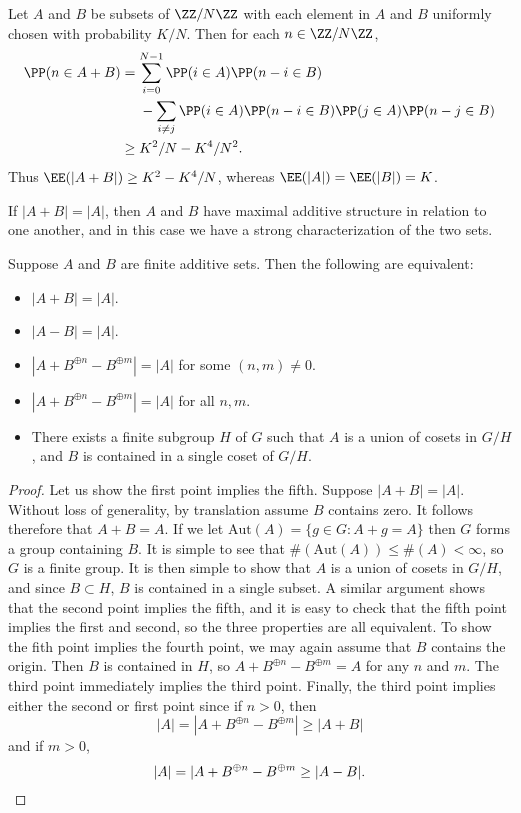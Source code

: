 \begin{example}
    Let $A$ and $B$ be subsets of $\ZZ/N \ZZ$ with each element in $A$ and $B$ uniformly chosen with probability $K/N$. Then for each $n \in \ZZ / N \ZZ$,
    \begin{align*}
        \PP(n \in A + B) &= \sum_{i = 0}^{N-1} \PP(i \in A) \PP(n-i \in B)\\
        &\ \ \ \ - \sum_{i \neq j} \PP(i \in A) \PP(n-i \in B) \PP(j \in A) \PP(n-j \in B)\\
        &\geq K^2/N - K^4/N^2.
    \end{align*}
    Thus $\EE(|A + B|) \geq K^2 - K^4/N$, whereas $\EE(|A|) = \EE(|B|) = K$.
\end{example}

If $|A + B| = |A|$, then $A$ and $B$ have maximal additive structure in relation to one another, and in this case we have a strong characterization of the two sets.

\begin{theorem}
    Suppose $A$ and $B$ are finite additive sets. Then the following are equivalent:
    \begin{itemize}
        \item $|A + B| = |A|$.
        \item $|A - B| = |A|$.
        \item $|A + B^{\oplus n} - B^{\oplus m}| = |A|$ for some $(n,m) \neq 0$.
        \item $|A + B^{\oplus n} - B^{\oplus m}| = |A|$ for all $n,m$.
        \item There exists a finite subgroup $H$ of $G$ such that $A$ is a union of cosets in $G/H$, and $B$ is contained in a single coset of $G/H$. 
    \end{itemize}
\end{theorem}
\begin{proof}
    Let us show the first point implies the fifth. Suppose $|A + B| = |A|$. Without loss of generality, by translation assume $B$ contains zero. It follows therefore that $A + B = A$. If we let $\text{Aut}(A) = \{ g \in G: A + g = A \}$ then $G$ forms a group containing $B$. It is simple to see that $\#(\text{Aut}(A)) \leq \#(A) < \infty$, so $G$ is a finite group. It is then simple to show that $A$ is a union of cosets in $G/H$, and since $B \subset H$, $B$ is contained in a single subset. A similar argument shows that the second point implies the fifth, and it is easy to check that the fifth point implies the first and second, so the three properties are all equivalent. To show the fith point implies the fourth point, we may again assume that $B$ contains the origin. Then $B$ is contained in $H$, so $A + B^{\oplus n} - B^{\oplus m} = A$ for any $n$ and $m$. The third point immediately implies the third point. Finally, the third point implies either the second or first point since if $n > 0$, then
    \[ |A| = |A + B^{\oplus n} - B^{\oplus m}| \geq |A + B| \]
    and if $m > 0$,
    \[ |A| = |A + B^{\oplus n} - B^{\oplus m} \geq |A - B|. \qedhere \]
\end{proof}


